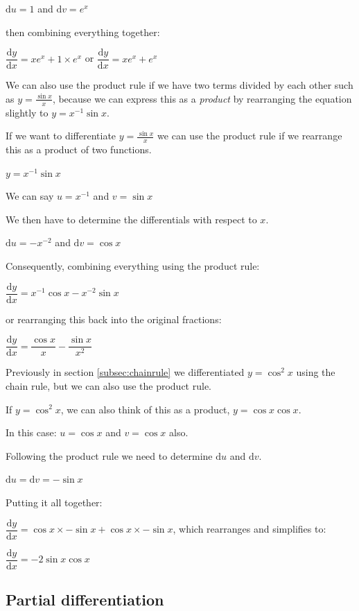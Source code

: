 \documentclass[
]{book}
\begin{document}
\(\textrm{d}u=1\) and \(\textrm{d}v=e^x\)

then combining everything together:

\(\dfrac{\textrm{d}y}{\textrm{d}x}=x e^x + 1 \times e^x\) or \(\dfrac{\textrm{d}y}{\textrm{d}x}=x e^x + e^x\)

We can also use the product rule if we have two terms divided by each other such as \(y=\frac{\sin x}{x}\), because we can express this as a \emph{product} by rearranging the equation slightly to \(y=x^{-1}\sin x\).

If we want to differentiate \(y=\frac{\sin x}{x}\) we can use the product rule if we rearrange this as a product of two functions.

\(y=x^{-1}\sin x\)

We can say \(u=x^{-1}\) and \(v=\sin x\)

We then have to determine the differentials with respect to \(x\).

\(\textrm{d}u=-x^{-2}\) and \(\textrm{d}v=\cos x\)

Consequently, combining everything using the product rule:

\(\dfrac{\textrm{d}y}{\textrm{d}x}=x^{-1}\cos x - x^{-2}\sin x\)

or rearranging this back into the original fractions:

\(\dfrac{\textrm{d}y}{\textrm{d}x}=\dfrac{\cos x}{x}-\dfrac{\sin x}{x^2}\)

Previously in section \ref{subsec:chainrule} we differentiated \(y=\cos ^2 x\) using the chain rule, but we can also use the product rule.

If \(y=\cos^2 x\), we can also think of this as a product, \(y= \cos x \cos x\).

In this case: \(u= \cos x\) and \(v=\cos x\) also.

Following the product rule we need to determine \(\textrm{d}u\) and \(\textrm{d}v\).

\(\textrm{d}u = \textrm{d}v = -\sin x\)

Putting it all together:

\(\dfrac{\textrm{d}y}{\textrm{d}x}= \cos x \times -\sin x + \cos x \times -\sin x\), which rearranges and simplifies to:

\(\dfrac{\textrm{d}y}{\textrm{d}x}= -2\sin x\cos x\)

\hypertarget{subsec:partial}{%
\subsection{Partial differentiation}\label{subsec:partial}}
\end{document}
